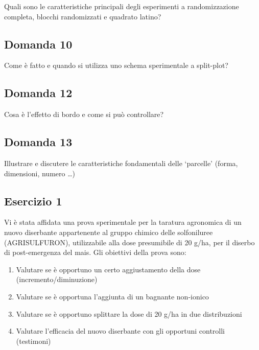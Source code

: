 \documentclass[
  12pt,
]{book}
\providecommand{\tightlist}{%
  \setlength{\itemsep}{0pt}\setlength{\parskip}{0pt}}
\begin{document}
Quali sono le caratteristiche principali degli esperimenti a randomizzazione completa, blocchi randomizzati e quadrato latino?

\hypertarget{domanda-10}{%
\subsection{Domanda 10}\label{domanda-10}}

Come è fatto e quando si utilizza uno schema sperimentale a split-plot?

\hypertarget{domanda-12}{%
\subsection{Domanda 12}\label{domanda-12}}

Cosa è l'effetto di bordo e come si può controllare?

\hypertarget{domanda-13}{%
\subsection{Domanda 13}\label{domanda-13}}

Illustrare e discutere le caratteristiche fondamentali delle `parcelle' (forma, dimensioni, numero \ldots)

\hypertarget{esercizio-1}{%
\subsection{Esercizio 1}\label{esercizio-1}}

Vi è stata affidata una prova sperimentale per la taratura agronomica di un nuovo diserbante appartenente al gruppo chimico delle solfoniluree (AGRISULFURON), utilizzabile alla dose presumibile di 20 g/ha, per il diserbo di post-emergenza del mais. Gli obiettivi della prova sono:

\begin{enumerate}
\def\labelenumi{\arabic{enumi}.}
\tightlist
\item
  Valutare se è opportuno un certo aggiustamento della dose (incremento/diminuzione)
\item
  Valutare se è opportuna l'aggiunta di un bagnante non-ionico
\item
  Valutare se è opportuno splittare la dose di 20 g/ha in due distribuzioni
\item
  Valutare l'efficacia del nuovo diserbante con gli opportuni controlli (testimoni)
\end{enumerate}
\end{document}
